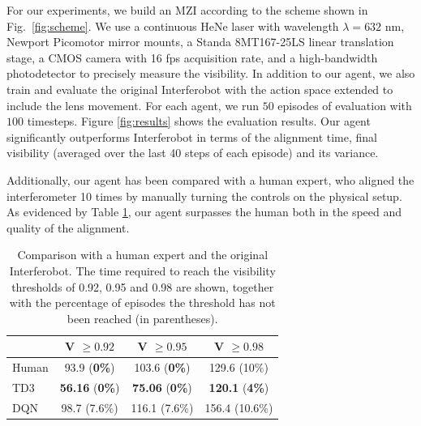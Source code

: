 For our experiments, we build an MZI according to the scheme shown in Fig.~\ref{fig:scheme}. We use a continuous HeNe laser with wavelength $\lambda = 632$ nm, Newport Picomotor mirror mounts, a Standa 8MT167-25LS linear translation stage, a CMOS camera with 16 fps acquisition rate, and a high-bandwidth photodetector to precisely measure the visibility. In addition to our agent, we also train and evaluate the original Interferobot \cite{sorokin2020interferobot} with the action space extended to include the lens movement. For each agent, we run $50$ episodes of evaluation with $100$ timesteps.  Figure \ref{fig:results} shows the evaluation results. Our agent significantly outperforms Interferobot in terms of the alignment time, final visibility (averaged over the last 40 steps of each episode) and its variance. 

Additionally, our agent has been compared with a human expert, who  aligned the interferometer 10 times by manually turning the controls on the physical setup. As evidenced by Table \ref{table:human}, our agent surpasses the human both in the speed and quality of the alignment. 

\begin{table}
\centering
    \begin{tabular}{lccc}\toprule
        &V $\ge 0.92$ & V $\ge 0.95$ & V $\ge 0.98$\\\midrule
        Human &  93.9 (\textbf{0\%})  & 103.6 (\textbf{0\%}) & 129.6 (10\%)\\
        TD3 &  \textbf{56.16} (\textbf{0\%}) & \textbf{75.06} (\textbf{0\%}) & \textbf{120.1} (\textbf{4\%})\\
        DQN &  98.7 (7.6\%) & 116.1 (7.6\%) & 156.4 (10.6\%)\\
        \bottomrule
    \end{tabular}
    \vskip 0.05in
    \caption{Comparison with a human expert and the original Interferobot. The time required to reach the visibility thresholds of 0.92, 0.95 and 0.98 are shown, together with the percentage of episodes the threshold has not been reached (in parentheses).}\label{Tab1}
    \label{table:human}
\end{table} 


